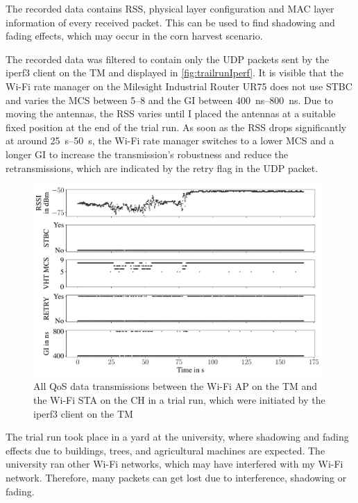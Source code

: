The recorded data contains \ac{RSS}, physical layer configuration and MAC layer information of every received packet.
This can be used to find shadowing and fading effects, which may occur in the corn harvest scenario.



The recorded data was filtered to contain only the \ac{UDP} packets sent by the iperf3 client on the \ac{TM}
and displayed in \autoref{fig:trailrunIperf}.
It is visible that the Wi-Fi rate manager on the Milesight Industrial Router UR75 does not use \ac{STBC} and varies
the \ac{MCS} between \numrange{5}{8} and the \ac{GI} between \SIrange{400}{800}{\nano\second}.
Due to moving the antennas, the \ac{RSS} varies until I placed the antennas at a suitable fixed position at the end of the trial run.
As soon as the \ac{RSS} drops significantly at around \SIrange{25}{50}{\second}, the Wi-Fi rate manager switches to a lower \ac{MCS} and a longer
\ac{GI} to increase the transmission's robustness and reduce the retransmissions, which are indicated by the retry flag in the \ac{UDP} packet.

\begin{figure}[]%
   \centering
   \includegraphics[width=0.98\textwidth]{figures/wireless5_144}
   \caption{All QoS data transmissions between the Wi-Fi \acf{AP} on the \acf{TM} and the Wi-Fi \ac{STA} on the \acf{CH} in a trial run,
   which were initiated by the iperf3 client on the \acf{TM}}
   \label{fig:trailrunIperf}%
\end{figure}

The trial run took place in a yard at the university, where shadowing and fading effects due to buildings, trees, and agricultural machines are
expected.
The university ran other Wi-Fi networks, which may have interfered with my Wi-Fi network.
Therefore, many packets can get lost due to interference, shadowing or fading.

